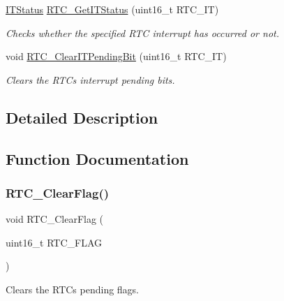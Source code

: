 \begin{DoxyCompactItemize}
\hyperlink{group___exported__types_gaacbd7ed539db0aacd973a0f6eca34074}{I\+T\+Status} \hyperlink{group___r_t_c___exported___functions_ga23274ad8aa28e86d5b0d58eee295db21}{R\+T\+C\+\_\+\+Get\+I\+T\+Status} (uint16\+\_\+t R\+T\+C\+\_\+\+IT)
\begin{DoxyCompactList}\small\item\em Checks whether the specified R\+TC interrupt has occurred or not. \end{DoxyCompactList}\item 
void \hyperlink{group___r_t_c___exported___functions_ga62b9a04d89a11f28db7dcfd50d9ee768}{R\+T\+C\+\_\+\+Clear\+I\+T\+Pending\+Bit} (uint16\+\_\+t R\+T\+C\+\_\+\+IT)
\begin{DoxyCompactList}\small\item\em Clears the R\+TC\textquotesingle{}s interrupt pending bits. \end{DoxyCompactList}\end{DoxyCompactItemize}


\subsection{Detailed Description}


\subsection{Function Documentation}
\mbox{\label{group___r_t_c___exported___functions_gacefb05730a77ffaa273c1ac3ade1a22f}} 
\subsubsection{\texorpdfstring{R\+T\+C\+\_\+\+Clear\+Flag()}{RTC\_ClearFlag()}}
{\footnotesize\ttfamily void R\+T\+C\+\_\+\+Clear\+Flag (\begin{DoxyParamCaption}\item[{uint16\+\_\+t}]{R\+T\+C\+\_\+\+F\+L\+AG }\end{DoxyParamCaption})}



Clears the R\+TC\textquotesingle{}s pending flags. 


